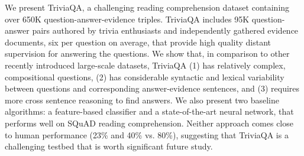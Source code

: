 We present TriviaQA, a challenging reading comprehension dataset containing over 650K question-answer-evidence triples. TriviaQA includes 95K question-answer  pairs authored by trivia enthusiasts and independently gathered evidence documents, six per question on average, that provide high quality distant supervision for answering the questions. We show that, in comparison to other recently introduced large-scale datasets, TriviaQA (1) has relatively complex, compositional questions,  (2)  has considerable syntactic and  lexical                                      variability  between questions and corresponding answer-evidence  sentences,  and  (3) requires more cross sentence reasoning to find answers.  We also present two baseline algorithms: a feature-based classifier and a state-of-the-art neural network, that performs well on SQuAD reading comprehension. Neither approach comes close to human performance (23\% and 40\% vs. 80\%), suggesting that TriviaQA is a challenging testbed that is worth significant future study.
